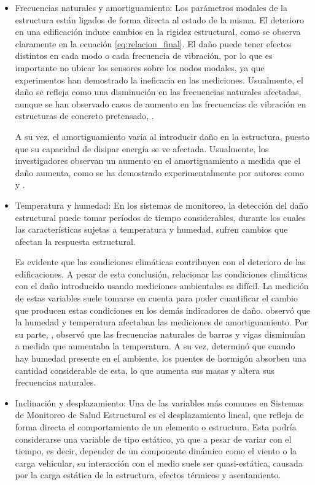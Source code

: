     \begin{itemize}
        \item Frecuencias naturales y amortiguamiento: Los parámetros modales de la estructura están ligados de forma directa al estado de la misma. El deterioro en una edificación induce cambios en la rigidez estructural, como se observa claramente en la ecuación \ref{eq:relacion_final}. El daño puede tener efectos distintos en cada modo o cada frecuencia de vibración, por lo que es importante no ubicar los sensores sobre los nodos modales, ya que experimentos han demostrado la ineficacia en las mediciones. Usualmente, el daño se refleja como una disminución en las frecuencias naturales afectadas, aunque se han observado casos de aumento en las frecuencias de vibración en estructuras de concreto pretensado, \citep{rytter1993vibration}.
        
        A su vez, el amortiguamiento varía al introducir daño en la estructura, puesto que su capacidad de disipar energía se ve afectada. Usualmente, los investigadores observan un aumento en el amortiguamiento a medida que el daño aumenta, como se ha demostrado experimentalmente por autores como \citet{hearn1991modal} y \citet{rytter1993vibration}.

        \item Temperatura y humedad: En los sistemas de monitoreo, la detección del daño estructural puede tomar períodos de tiempo considerables, durante los cuales las características sujetas a temperatura y humedad, sufren cambios que afectan la respuesta estructural.
                
        Es evidente que las condiciones climáticas contribuyen con el deterioro de las edificaciones. A pesar de esta conclusión, relacionar las condiciones climáticas con el daño introducido usando mediciones ambientales es difícil. La medición de estas variables suele tomarse en cuenta para poder cuantificar el cambio que producen estas condiciones en los demás indicadores de daño. \citet{rytter1993vibration} observó que la humedad y temperatura afectaban las mediciones de amortiguamiento. Por su parte, \citet{mohamed2014}, observó que las frecuencias naturales de barras y vigas disminuían a medida que aumentaba la temperatura. A su vez, \citet{sohn2007effects} determinó que cuando hay humedad presente en el ambiente, los puentes de hormigón absorben una cantidad considerable de esta, lo que aumenta sus masas y altera sus frecuencias naturales.
        
        \item Inclinación y desplazamiento: Una de las variables más comunes en Sistemas de Monitoreo de Salud Estructural es el desplazamiento lineal, que refleja de forma directa el comportamiento de un elemento o estructura. Esta podría considerarse una variable de tipo estático, ya que a pesar de variar con el tiempo, es decir, depender de un componente dinámico como el viento o la carga vehicular, su interacción con el medio suele ser quasi-estática, causada por la carga estática de la estructura, efectos térmicos y asentamiento.
        

\end{itemize}
